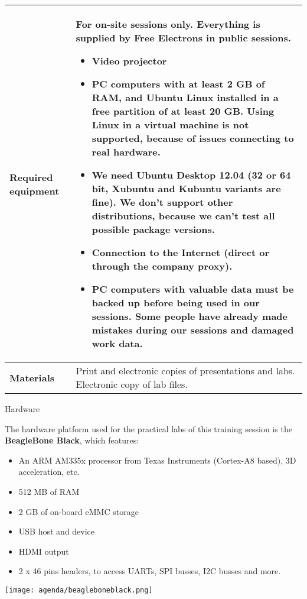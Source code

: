 \documentclass[a4paper,12pt,obeyspaces,spaces,hyphens]{article}
\begin{document}
{\begin{tabularx}{\textwidth}{|g|h|}
    {\bf Required equipment} &
    {\bf For on-site sessions only.}
    \newline Everything is supplied by Free Electrons in public
    sessions.
    \begin{itemize}
    \item Video projector
    \item PC computers with at least 2 GB of RAM, and Ubuntu Linux
    installed in a {\bf free partition of at least 20 GB. Using Linux
      in a virtual machine is not supported}, because of issues
    connecting to real hardware.
    \item We need Ubuntu Desktop 12.04 (32 or 64 bit, Xubuntu and
    Kubuntu variants are fine). We don't support other
    distributions, because we can't test all possible package versions.
    \item {\bf Connection to the Internet} (direct or through the
    company proxy).
    \item {\bf PC computers with valuable data must be backed up}
    before being used in our sessions.  Some people have already made
    mistakes during our sessions and damaged work data.
    \end{itemize} \\
    \hline

    {\bf Materials} & Print and electronic copies of presentations and
    labs.
    \newline Electronic copy of lab files.\\
    \hline

\end{tabularx}}

\feagendatwocolumn
{Hardware}
{
  The hardware platform used for the practical labs of this training
  session is the {\bf BeagleBone Black}, which features:

  \begin{itemize}
  \item An ARM AM335x processor from Texas Instruments (Cortex-A8
    based), 3D acceleration, etc.
  \item 512 MB of RAM
  \item 2 GB of on-board eMMC storage
  \item USB host and device
  \item HDMI output
  \item 2 x 46 pins headers, to access UARTs, SPI busses, I2C busses
    and more.
  \end{itemize}
}
{}
{
  \begin{center}
    \texttt{[image: agenda/beagleboneblack.png]}
  \end{center}
}
\end{document}
